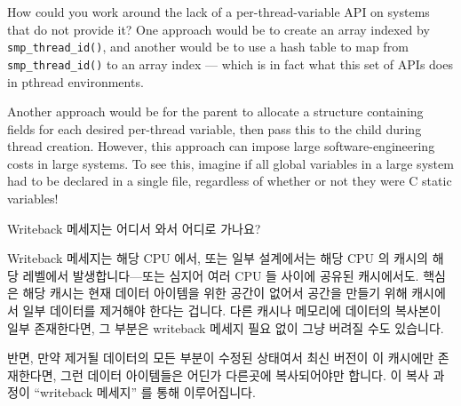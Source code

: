 \begin{enumerate}
\QuickQ{}
	How could you work around the lack of a per-thread-variable
	API on systems that do not provide it?
\QuickA{}
	One approach would be to create an array indexed by
	{\tt smp\_thread\_id()}, and another would be to use a hash
	table to map from {\tt smp\_thread\_id()} to an array
	index --- which is in fact what this
	set of APIs does in pthread environments.

	Another approach would be for the parent to allocate a structure
	containing fields for each desired per-thread variable, then
	pass this to the child during thread creation.
	However, this approach can impose large software-engineering
	costs in large systems.
	To see this, imagine if all global variables in a large system
	had to be declared in a single file, regardless of whether or
	not they were C static variables!

\QuickQ{}
	Writeback 메세지는 어디서 와서 어디로 가나요?

\QuickA{}
	Writeback 메세지는 해당 CPU 에서, 또는 일부 설계에서는 해당 CPU 의
	캐시의 해당 레벨에서 발생합니다---또는 심지어 여러 CPU 들 사이에 공유된
	캐시에서도.
	핵심은 해당 캐시는 현재 데이터 아이템을 위한 공간이 없어서 공간을
	만들기 위해 캐시에서 일부 데이터를 제거해야 한다는 겁니다.
	다른 캐시나 메모리에 데이터의 복사본이 일부 존재한다면, 그 부분은
	writeback 메세지 필요 없이 그냥 버려질 수도 있습니다.

	반면, 만약 제거될 데이터의 모든 부분이 수정된 상태여서 최신 버전이 이
	캐시에만 존재한다면, 그런 데이터 아이템들은 어딘가 다른곳에
	복사되어야만 합니다.
	이 복사 과정이 ``writeback 메세지'' 를 통해 이루어집니다.

\end{enumerate}
